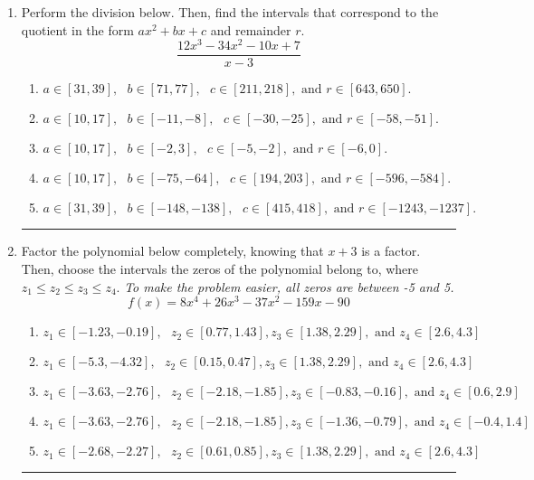 \documentclass[14pt]{extbook}
\newcommand{\litem}[1]{\item#1\hspace*{-1cm}\rule{\textwidth}{0.4pt}}
\begin{document}
\begin{enumerate}
{\begin{enumerate}[label=\Alph*.]
\end{enumerate} }
\litem{
Perform the division below. Then, find the intervals that correspond to the quotient in the form $ax^2+bx+c$ and remainder $r$.\[ \frac{12x^{3} -34 x^{2} -10 x + 7}{x -3} \]\begin{enumerate}[label=\Alph*.]
\item \( a \in [31, 39], \text{   } b \in [71, 77], \text{   } c \in [211, 218], \text{   and   } r \in [643, 650]. \)
\item \( a \in [10, 17], \text{   } b \in [-11, -8], \text{   } c \in [-30, -25], \text{   and   } r \in [-58, -51]. \)
\item \( a \in [10, 17], \text{   } b \in [-2, 3], \text{   } c \in [-5, -2], \text{   and   } r \in [-6, 0]. \)
\item \( a \in [10, 17], \text{   } b \in [-75, -64], \text{   } c \in [194, 203], \text{   and   } r \in [-596, -584]. \)
\item \( a \in [31, 39], \text{   } b \in [-148, -138], \text{   } c \in [415, 418], \text{   and   } r \in [-1243, -1237]. \)

\end{enumerate} }
\litem{
Factor the polynomial below completely, knowing that $x + 3$ is a factor. Then, choose the intervals the zeros of the polynomial belong to, where $z_1 \leq z_2 \leq z_3 \leq z_4$. \textit{To make the problem easier, all zeros are between -5 and 5.}\[ f(x) = 8x^{4} +26 x^{3} -37 x^{2} -159 x -90 \]\begin{enumerate}[label=\Alph*.]
\item \( z_1 \in [-1.23, -0.19], \text{   }  z_2 \in [0.77, 1.43], z_3 \in [1.38, 2.29], \text{   and   } z_4 \in [2.6, 4.3] \)
\item \( z_1 \in [-5.3, -4.32], \text{   }  z_2 \in [0.15, 0.47], z_3 \in [1.38, 2.29], \text{   and   } z_4 \in [2.6, 4.3] \)
\item \( z_1 \in [-3.63, -2.76], \text{   }  z_2 \in [-2.18, -1.85], z_3 \in [-0.83, -0.16], \text{   and   } z_4 \in [0.6, 2.9] \)
\item \( z_1 \in [-3.63, -2.76], \text{   }  z_2 \in [-2.18, -1.85], z_3 \in [-1.36, -0.79], \text{   and   } z_4 \in [-0.4, 1.4] \)
\item \( z_1 \in [-2.68, -2.27], \text{   }  z_2 \in [0.61, 0.85], z_3 \in [1.38, 2.29], \text{   and   } z_4 \in [2.6, 4.3] \)


\end{enumerate}}
\end{enumerate}
\end{document}
